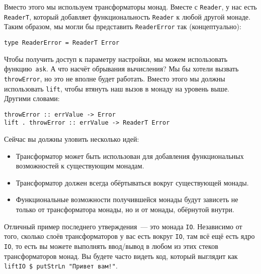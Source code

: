 Вместо этого мы используем трансформаторы монад. Вместе с \lstinline'Reader', у
нас есть \lstinline'ReaderT', который добавляет функциональность
\lstinline'Reader' к любой другой монаде. Таким образом, мы могли бы представить
\lstinline'ReaderError' так (концептуально):
\begin{lstlisting}
type ReaderError = ReaderT Error
\end{lstlisting}

Чтобы получить доступ к параметру настройки, мы можем использовать
функцию~\lstinline'ask'. А что насчёт обрывания вычисления? Мы бы хотели вызвать
\lstinline'throwError', но это не вполне будет работать. Вместо этого мы должны
использовать \lstinline'lift', чтобы втянуть наш вызов в монаду на уровень
выше. Другими словами:
\begin{lstlisting}
throwError :: errValue -> Error
lift . throwError :: errValue -> ReaderT Error
\end{lstlisting}

Сейчас вы должны уловить несколько идей:
\begin{itemize}
    \item  Трансформатор может быть использован для добавления функциональных
        возможностей к существующим монадам.
    \item  Трансформатор должен всегда обёртываться вокруг существующей монады.
    \item  Функциональные возможности получившейся монады будут зависеть не
        только от трансформатора монады, но и от монады, обёрнутой внутри.
\end{itemize}

Отличный пример последнего утверждения~--- это монада \lstinline'IO'. Независимо
от того, сколько слоёв трансформаторов у вас есть вокруг \lstinline'IO', там всё
ещё есть ядро \lstinline'IO', то есть вы можете выполнять ввод/вывод в любом из
этих стеков трансформаторов монад. Вы будете часто видеть код, который выглядит
как \lstinline'liftIO $ putStrLn "Привет вам!"'.

